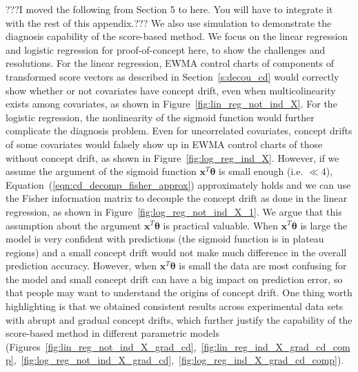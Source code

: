 \documentclass[twoside,11pt]{article}
\begin{document}
\begin{appendix}
\begin{enumerate}[(I)]
???I moved the following from Section 5 to here. You will have to integrate it with the rest of this appendix.??? We also use simulation to demonstrate the diagnosis capability of the score-based method. We focus on the linear regression and logistic regression for proof-of-concept here, to show the challenges and resolutions. For the linear regression, EWMA control charts of components of transformed score vectors as described in Section~\ref{s:decou_cd} would correctly show whether or not covariates have concept drift, even when multicolinearity exists among covariates, as shown in Figure~\ref{fig:lin_reg_not_ind_X}. For the logistic regression, the nonlinearity of the sigmoid function would further complicate the diagnosis problem. Even for uncorrelated covariates, concept drifts of some covariates would falsely show up in EWMA control charts of those without concept drift, as shown in Figure~\ref{fig:log_reg_ind_X}. However, if we assume the argument of the sigmoid function $\bm{x}^T\bm{\theta}$ is small enough (i.e. $\ll 4$), Equation~(\ref{eqn:cd_decomp_fisher_approx}) approximately holds and we can use the Fisher information matrix to decouple the concept drift as done in the linear regression, as shown in Figure~\ref{fig:log_reg_not_ind_X_1}. We argue that this assumption about the argument $\bm{x}^T\bm{\theta}$ is practical valuable. When $\bm{x}^T\bm{\theta}$ is large the model is very confident with predictions (the sigmoid function is in plateau regions) and a small concept drift would not make much difference in the overall prediction accuracy. However, when $\bm{x}^T\bm{\theta}$ is small the data are most confusing for the model and small concept drift can have a big impact on prediction error, so that people may want to understand the origins of concept drift. One thing worth highlighting is that we obtained consistent results across experimental data sets with abrupt and gradual concept drifts, which further justify the capability of the score-based method in different parametric models (Figures~\ref{fig:lin_reg_not_ind_X_grad_cd},~\ref{fig:lin_reg_ind_X_grad_cd_comp},~\ref{fig:log_reg_not_ind_X_grad_cd},~\ref{fig:log_reg_ind_X_grad_cd_comp}).



\end{enumerate}

\end{appendix}

\end{document}
